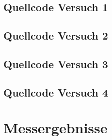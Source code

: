 \documentclass[12pt, oneside, a4paper, \docLanguage]{report}
\begin{document}
\subsection{Quellcode Versuch 1}
\label{chap:APPENDIX_SOURCECODE_V1}

\subsection{Quellcode Versuch 2}
\label{chap:APPENDIX_SOURCECODE_V2}

\subsection{Quellcode Versuch 3}
\label{chap:APPENDIX_SOURCECODE_V3}

\subsection{Quellcode Versuch 4}
\label{chap:APPENDIX_SOURCECODE_V4}


\section{Messergebnisse}
\label{chap:APPENDIX_MEASUREMENT_SOURCE}

%
%

\end{document}
